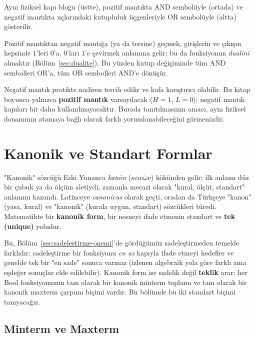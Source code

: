 Aynı fiziksel kapı bloğu (üstte), pozitif mantıkta AND sembolüyle (ortada) ve negatif
mantıkta uçlarındaki kutupluluk üçgenleriyle OR sembolüyle (altta) gösterilir.

Pozitif mantıktan negatif mantığa (ya da tersine) geçmek, girişlerin ve çıkışın hepsinde
$1$'leri $0$'a, $0$'ları $1$'e çevirmek anlamına gelir; bu da fonksiyonun \emph{dualini}
almaktır (Bölüm~\ref{sec:dualite}). Bu yüzden kutup değişiminde tüm AND sembolleri OR'a,
tüm OR sembolleri AND'e dönüşür.

\begin{bilginot}
Negatif mantık pratikte nadiren tercih edilir ve kafa karıştırıcı olabilir. Bu kitap
boyunca yalnızca \textbf{pozitif mantık} varsayılacak ($H=1$, $L=0$); negatif mantık
kapıları bir daha kullanılmayacaktır. Burada tanıtılmasının amacı, aynı fiziksel
donanımın atamaya bağlı olarak farklı yorumlanabileceğini görmenizdir.
\end{bilginot}

\section{Kanonik ve Standart Formlar}
\label{sec:kanonik-standart-formlar}

"Kanonik" sözcüğü Eski Yunanca \emph{kanōn} ($\kappa\alpha\nu\acute{\omega}\nu$)
kökünden gelir; ilk anlamı düz bir çubuk ya da ölçüm aletiydi, zamanla mecazi olarak
"kural, ölçüt, standart" anlamını kazandı. Latinceye \emph{canonicus} olarak geçti,
oradan da Türkçeye "kanon" (yasa, kural) ve "kanonik" (kurala uygun, standart)
sözcükleri türedi. Matematikte bir \textbf{kanonik form}, bir nesneyi ifade etmenin
standart ve \textbf{tek (unique)} yoludur.

Bu, Bölüm~\ref{sec:sadelestirme-onemi}'de gördüğümüz sadeleştirmeden temelde
farklıdır: sadeleştirme bir fonksiyonu \emph{en az} kapıyla ifade etmeyi hedefler ve
genelde tek bir "en sade" sonuca varmaz (izlenen algebraik yola göre farklı ama eşdeğer
sonuçlar elde edilebilir). Kanonik form ise sadelik değil \textbf{teklik} arar: her Bool
fonksiyonunun tam olarak bir kanonik minterm toplamı ve tam olarak bir kanonik maxterm
çarpımı biçimi vardır. Bu bölümde bu iki standart biçimi tanıyacağız.

\subsection{Minterm ve Maxterm}
\label{sec:minterm-maxterm}

